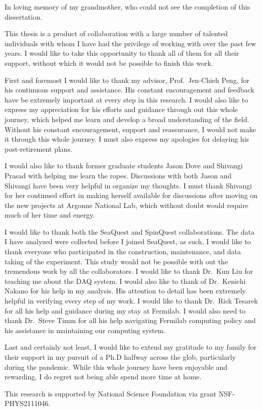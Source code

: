 \documentclass[../main.tex]{subfiles}
\begin{document}
\begin{dedication}
	In loving memory of my grandmother, who could not see the completion of this dissertation.
\end{dedication}

\begin{acknowledgments}
	This thesis is a product of collaboration with a large number of talented
	individuals with whom I have had the privilege of working with over the past
	few years. I would like to take this opportunity to thank all of them for all
	their support, without which it would not be possible to finish this work.

	First and foremost I would like to thank my advisor, Prof.~Jen-Chieh Peng, for
	his continuous support and assistance. His constant encouragement and feedback
	have be extremely important at every step in this research. 
	I would also like to express my	appreciation for his efforts and guidance
	through out this whole journey, which helped me learn and develop a broad
	understanding of the field. 
	Without his constant encouragement, support
	and reassurance, I would not  make it through this whole journey.
	I must also express my apologies for delaying his post-retirement plans.

	I would also like to thank former graduate students Jason Dove and Shivangi
	Prasad with helping me learn the ropes. Discussions with both Jason and
	Shivangi have been very helpful in organize my thoughts.
	I must thank Shivangi for her continued effort in making herself available for 
	discussions after moving on the new projects at Argonne National Lab, which
	without doubt would require much of her time and energy.

	I would like to thank both the SeaQuest and SpinQuest collaborations.
	The data I have analyzed were collected before I joined SeaQuest, as such,
	I would like to thank everyone who participated in the construction, maintenance,
	and data taking of the experiment.
	This study would not be possible with out the tremendous work by all the collaborators. 
	I would like to thank Dr.~Kun Liu for teaching me about the DAQ system.
	I would also like to thank of Dr.~Kenichi Nakano for his help in my analysis.
	His attention to detail has been extremely helpful in verifying every step
	of my work.
	I would like to thank Dr.~Rick Tesarek for all his help and guidance during my
	stay at Fermilab. 
	I would also need to thank Dr.~Steve Timm for all his help navigating Fermilab 
	computing policy and his assistance in maintaining our computing system.
	
	Last and certainly not least, I would like to extend my gratitude to my family
	for their support in my pursuit of a Ph.D halfway across the glob, particularly
	during the pandemic. While this whole journey have been enjoyable and rewarding, 
	I do regret not being able spend more time at home.

	This research is supported by National Science Foundation via grant NSF-PHYS2111046.

\end{acknowledgments}
\end{document}
